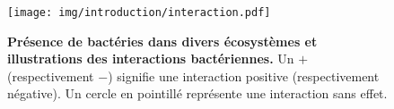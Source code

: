 \begin{figure}
    \centering
    \texttt{[image: img/introduction/interaction.pdf]}
    \caption{ \textbf{Présence de bactéries dans divers écosystèmes et illustrations des interactions bactériennes.} Un $+$  (respectivement $-$) signifie une interaction positive (respectivement négative). Un cercle en pointillé représente une interaction sans effet.}
    \label{fig:interaction}
\end{figure}
%
%
%
%
%
%
